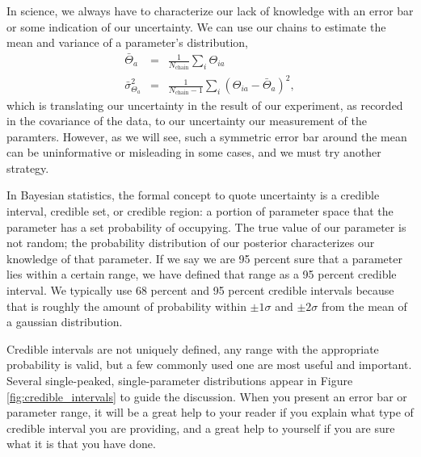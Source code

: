 In science, we always have to characterize our lack of knowledge with an error bar or some indication of our uncertainty.  We can use our chains to estimate the mean and variance of a parameter's distribution,
\begin{eqnarray}
  \bar{\Theta}_a &=&  \frac{1}{N_\textrm{chain}} \sum_i \Theta_{ia} \\ \nonumber
  \bar{\sigma}^2_{\Theta_a} &=&  \frac{1}{N_\textrm{chain}-1} \sum_i \left(\Theta_{ia} - \bar{\Theta}_a \right)^2, 
\end{eqnarray}
which is translating our uncertainty in the result of our experiment, as recorded in the covariance of the data, to our uncertainty our measurement of the paramters.  However, as we will see, such a symmetric error bar around the mean can be uninformative or misleading in some cases, and we must try another strategy.

In Bayesian statistics, the formal concept to quote uncertainty is a credible interval, credible set, or credible region: a portion of parameter space that the parameter has a set probability of occupying.  The true value of our parameter is not random; the probability distribution of our posterior characterizes our knowledge of that parameter.  If we say we are 95 percent sure that a parameter lies within a certain range, we have defined that range as a 95 percent  credible interval.  We typically use 68 percent and 95 percent credible intervals because that is roughly the amount of probability within $\pm 1\sigma$ and $\pm 2 \sigma$ from the mean of a gaussian distribution.

Credible intervals are not uniquely defined, any range with the appropriate probability is valid, but a few commonly used one are most useful and important.  Several single-peaked, single-parameter distributions appear in Figure \ref{fig:credible_intervals} to guide the discussion.  When you present an error bar or parameter range, it will be a great help to your reader if you explain what type of credible interval you are providing, and a great help to yourself if you are sure what it is that you have done.


